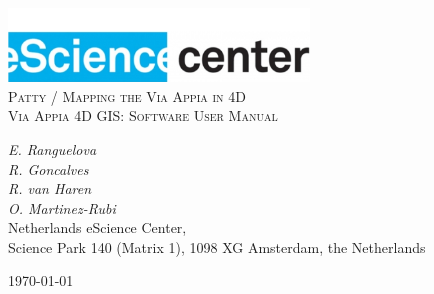 \documentclass[a4paper,11pt]{article}
\begin{document}
\begin{titlepage}
\begin{center}
\includegraphics[width=0.6\textwidth]{fig/logo}\\[3cm]    
\textsc{\LARGE Patty / Mapping the Via Appia in 4D}\\[0.5cm]
\textsc{\large Via Appia 4D GIS: Software User Manual}\\[0.5cm]
\vfill
\end{center}
{\large
\emph{E. Ranguelova} \\
\emph{R. Goncalves } \\
\emph{R. van Haren } \\
\emph{O. Martinez-Rubi } \\
}
{\large
{Netherlands eScience Center, \\
Science Park 140 (Matrix 1), 1098 XG Amsterdam, the Netherlands\\
}
}
\begin{center}
{\large \today}
\end{center}
\end{titlepage}

\tableofcontents

\newpage













\end{document}
